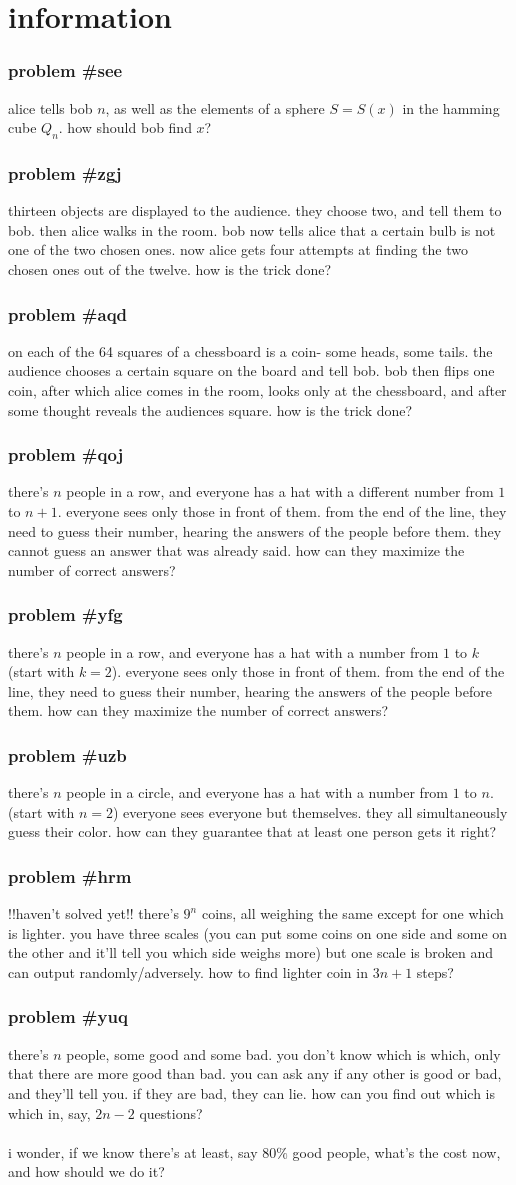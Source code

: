 \documentclass{article}
\newcommand{\problem}[1]{\subsubsection*{\textbf{problem \##1}}}
\newcommand{\chapter}[1]{\section*{#1}}
\begin{document}
\chapter{information}
\problem{see} alice tells bob $n$, as well as the elements of a sphere $S=S(x)$ in the hamming cube $Q_n$. how should bob find $x$?
\problem{zgj} thirteen objects are displayed to the audience. they choose two, and tell them to bob. then alice walks in the room. bob now tells alice that a certain bulb is not one of the two chosen ones. now alice gets four attempts at finding the two chosen ones out of the twelve. how is the trick done?
\problem{aqd} on each of the 64 squares of a chessboard is a coin- some heads, some tails. the audience chooses a certain square on the board and tell bob. bob then flips one coin, after which alice comes in the room, looks only at the chessboard, and after some thought reveals the audiences square. how is the trick done?
\problem{qoj} there's $n$ people in a row, and everyone has a hat with a different number from $1$ to $n+1$. everyone sees only those in front of them. from the end of the line, they need to guess their number, hearing the answers of the people before them. they cannot guess an answer that was already said. how can they maximize the number of correct answers?
\problem{yfg} there's $n$ people in a row, and everyone has a hat with a number from $1$ to $k$ (start with $k=2$). everyone sees only those in front of them. from the end of the line, they need to guess their number, hearing the answers of the people before them. how can they maximize the number of correct answers?
\problem{uzb} there's $n$ people in a circle, and everyone has a hat with a number from $1$ to $n$. (start with $n=2$) everyone sees everyone but themselves. they all simultaneously guess their color. how can they guarantee that at least one person gets it right?
\problem{hrm} !!haven't solved yet!! there's $9^n$ coins, all weighing the same except for one which is lighter. you have three scales (you can put some coins on one side and some on the other and it'll tell you which side weighs more) but one scale is broken and can output randomly/adversely. how to find lighter coin in $3n+1$ steps?
\problem{yuq} there's $n$ people, some good and some bad. you don't know which is which, only that there are more good than bad. you can ask any if any other is good or bad, and they'll tell you. if they are bad, they can lie. how can you find out which is which in, say, $2n-2$ questions?\\\\
i wonder, if we know there's at least, say $80\%$ good people, what's the cost now, and how should we do it?
\end{document}
